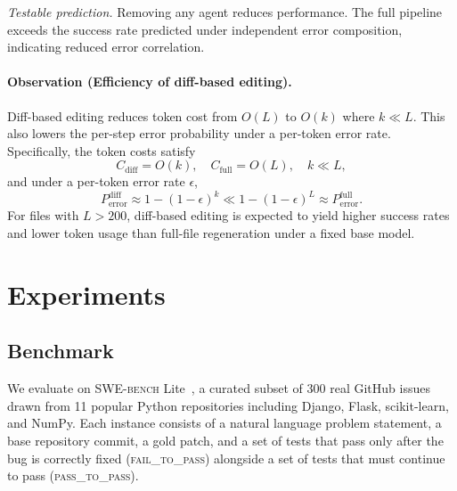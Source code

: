 \documentclass[journal]{IEEEtran}
\newcommand{\swebench}{\textsc{SWE-bench}}
\begin{document}
\textit{Testable prediction.}
Removing any agent reduces performance. The full pipeline exceeds the success rate predicted under independent error composition, indicating reduced error correlation.

\paragraph{Observation (Efficiency of diff-based editing).}
Diff-based editing reduces token cost from $O(L)$ to $O(k)$ where $k \ll L$. This also lowers the per-step error probability under a per-token error rate. Specifically, the token costs satisfy
\begin{equation}
C_{\text{diff}} = O(k), \quad C_{\text{full}} = O(L), \quad k \ll L,
\end{equation}
and under a per-token error rate $\epsilon$,
\begin{equation}
P_{\text{error}}^{\text{diff}} \approx 1 - (1 - \epsilon)^k \ll 1 - (1 - \epsilon)^L \approx P_{\text{error}}^{\text{full}}.
\end{equation}
For files with $L > 200$, diff-based editing is expected to yield higher success rates and lower token usage than full-file regeneration under a fixed base model.


\section{Experiments}
\label{sec:experiments}

\subsection{Benchmark}

We evaluate on \swebench{} Lite~\cite{jimenez2024swebench}, a curated subset of 300 real GitHub issues drawn from 11 popular Python repositories including Django, Flask, scikit-learn, and NumPy. Each instance consists of a natural language problem statement, a base repository commit, a gold patch, and a set of tests that pass only after the bug is correctly fixed (\textsc{fail\_to\_pass}) alongside a set of tests that must continue to pass (\textsc{pass\_to\_pass}).
\end{document}
